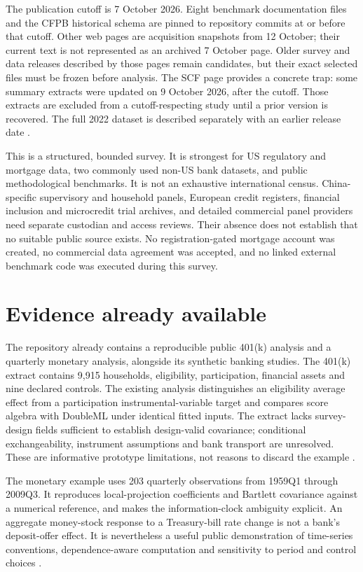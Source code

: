 The publication cutoff is 7 October 2026. Eight benchmark documentation
files and the CFPB historical schema are pinned to repository commits at
or before that cutoff. Other web pages are acquisition snapshots from 12
October; their current text is not represented as an archived 7 October
page. Older survey and data releases described by those pages remain
candidates, but their exact selected files must be frozen before
analysis. The SCF page provides a concrete trap: some summary extracts
were updated on 9 October 2026, after the cutoff. Those extracts are
excluded from a cutoff-respecting study until a prior version is
recovered. The full 2022 dataset is described separately with an earlier
release date \citep{pd15_scf}.

This is a structured, bounded survey. It is strongest for US regulatory
and mortgage data, two commonly used non-US bank datasets, and public
methodological benchmarks. It is not an exhaustive international census.
China-specific supervisory and household panels, European credit
registers, financial inclusion and microcredit trial archives, and
detailed commercial panel providers need separate custodian and access
reviews. Their absence does not establish that no suitable public source
exists. No registration-gated mortgage account was created, no
commercial data agreement was accepted, and no linked external benchmark
code was executed during this survey.

\hypertarget{evidence-already-available}{%
\section{Evidence already available}\label{evidence-already-available}}

The repository already contains a reproducible public 401(k) analysis
and a quarterly monetary analysis, alongside its synthetic banking
studies. The 401(k) extract contains 9,915 households, eligibility,
participation, financial assets and nine declared controls. The existing
analysis distinguishes an eligibility average effect from a
participation instrumental-variable target and compares score algebra
with DoubleML under identical fitted inputs. The extract lacks
survey-design fields sufficient to establish design-valid covariance;
conditional exchangeability, instrument assumptions and bank transport
are unresolved. These are informative prototype limitations, not reasons
to discard the example \citep{public401k}.

The monetary example uses 203 quarterly observations from 1959Q1 through
2009Q3. It reproduces local-projection coefficients and Bartlett
covariance against a numerical reference, and makes the
information-clock ambiguity explicit. An aggregate money-stock response
to a Treasury-bill rate change is not a bank's deposit-offer effect. It
is nevertheless a useful public demonstration of time-series
conventions, dependence-aware computation and sensitivity to period and
control choices \citep{public_macrodata_dynamic}.


